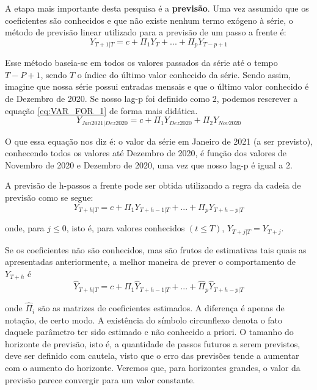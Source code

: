 \documentclass[12pt]{article}
\begin{document}
	A etapa mais importante desta pesquisa é a \textbf{previsão}. Uma vez assumido que os coeficientes são conhecidos e que não existe nenhum termo exógeno à série, o método de previsão linear utilizado para a previsão de um passo a frente é:
	\begin{equation}\label{eq:VAR_FOR_1}
		Y_{T+1|T}=c+\Pi_1Y_{T}+...+\Pi_pY_{T-p+1}
	\end{equation} 
	
	Esse método baseia-se em todos os valores passados da série até o tempo $T-P+1$, sendo $T$ o índice do último valor conhecido da série. Sendo assim, imagine que nossa série possui entradas mensais e que o último valor conhecido é de Dezembro de 2020. Se nosso \textrm{lag-p}  foi definido como 2, podemos rescrever a equação \ref{eq:VAR_FOR_1} de forma mais didática.
	\begin{equation*}
		Y_{Jan2021|Dez2020}=c+\Pi_1Y_{Dez2020}+\Pi_2Y_{Nov2020}
	\end{equation*}

	O que essa equação nos diz é: o valor da série em Janeiro de 2021 (a ser previsto), conhecendo todos os valores até Dezembro de 2020, é função dos valores de Novembro de 2020 e Dezembro de 2020, uma vez que nosso \textrm{lag-p} é igual a 2.
	
	A previsão de h-passos a frente pode ser obtida utilizando a regra da cadeia de previsão \cite{VAR} como se segue:
	\begin{equation}\label{eq:VAR_FOR_h}
		Y_{T+h|T}=c+\Pi_1Y_{T+h-1|T}+...+\Pi_pY_{T+h-p|T}
	\end{equation}
	
	onde, para $j\leq0$, isto é, para valores conhecidos $(t\leq T)$, $Y_{T+j|T}=Y_{T+j}$.
	
	Se os coeficientes não são conhecidos, mas são frutos de estimativas tais quais as apresentadas anteriormente, a melhor maneira de prever o comportamento de $Y_{T+h}$ é
	\begin{equation}
		\hat{Y}_{T+h|T}=c+\hat{\Pi}_1\hat{Y}_{T+h-1|T}+...+\hat{\Pi}_p\hat{Y}_{T+h-p|T}
	\end{equation}

	onde $\hat{\Pi}_i$ são as matrizes de coeficientes estimados. A diferença é apenas de notação, de certo modo. A existência do símbolo circunflexo denota o fato daquele parâmetro ter sido estimado e não conhecido a priori. O tamanho do horizonte de previsão, isto é, a quantidade de passos futuros a serem previstos, deve ser definido com cautela,  visto que o erro das previsões tende a aumentar com o aumento do horizonte. Veremos que, para horizontes grandes, o valor da previsão parece convergir para um valor constante.
	
\end{document}
